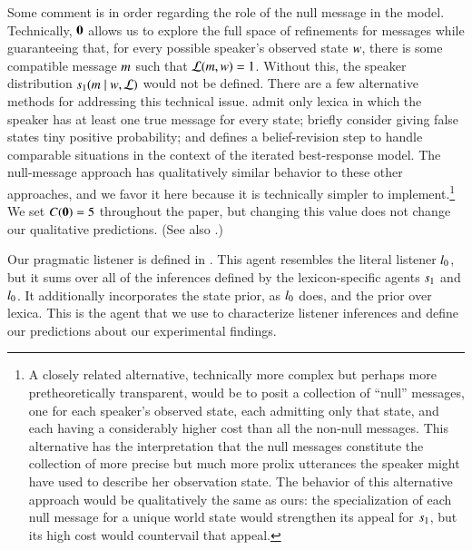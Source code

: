 \documentclass[leqno,12pt]{article}
\begin{document}
Some comment is in order regarding the role of the null message in the
model.  Technically, $\mathbf{0}$ allows us to explore the full space of
refinements for messages while guaranteeing that, for every possible
speaker's observed state $w$, there is some compatible message
$m$ such that $\mathcal{L}(m, w) = 1$.  Without this, the speaker
distribution $s_{1}(m \mid w, \mathcal{L})$ would not be
defined.  There are a few alternative methods for addressing this
technical issue. \citet{Bergen:Goodman:Levy:2012} admit only lexica in
which the speaker has at least one true message for every state;
\citet{Bergen:Levy:Goodman:2014} briefly consider giving false states
tiny positive probability; and \citet{Jaeger:2011} defines a
belief-revision step to handle comparable situations in the context of
the iterated best-response model. The null-message approach has
qualitatively similar behavior to these other approaches, and we favor
it here because it is technically simpler to implement.\footnote{A
  closely related alternative, technically more complex but perhaps
  more pretheoretically transparent, would be to posit a collection of
  ``null'' messages, one for each speaker's observed state, each
  admitting only that state, and each having a considerably higher
  cost than all the non-null messages. This alternative has the
  interpretation that the null messages constitute the collection of
  more precise but much more prolix utterances the speaker might have
  used to describe her observation state.  The behavior of this
  alternative approach would be qualitatively the same as ours: the
  specialization of each null message for a unique world state would
  strengthen its appeal for $s_{1}$, but its high cost would
  countervail that appeal.}  We set $C(\mathbf{0}) = 5$ throughout
the paper, but changing this value does not change our qualitative
predictions.  (See also .)

Our pragmatic listener is defined in . This agent
resembles the literal listener $l_{0}$, but it sums over all
of the inferences defined by the lexicon-specific agents $s_{1}$
and $l_{0}$. It additionally incorporates the state prior, as
$l_{0}$ does, and the prior over lexica.  This is the agent
that we use to characterize listener inferences and define our
predictions about our experimental findings.
\end{document}
